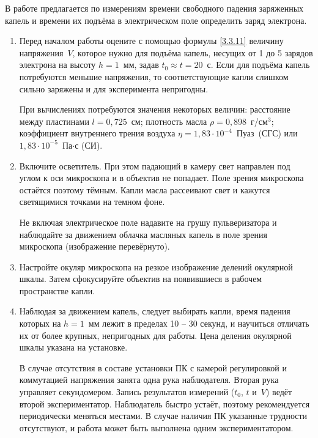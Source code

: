 \begin{lab:task}

В работе предлагается по измерениям времени свободного падения заряженных капель
и времени их подъёма в электрическом поле определить заряд электрона.

\begin{enumerate}

\item{Перед началом работы оцените с помощью формулы \eqref{3.3.11} величину
напряжения~$V$, которое нужно для подъёма капель, несущих от 1 до 5 зарядов
электрона на высоту $h=1$~мм, задав $t_0\approx t=20$~с. Если для подъёма капель
потребуются меньшие напряжения, то соответствующие капли слишком сильно заряжены
и для эксперимента непригодны.

При вычислениях потребуются значения некоторых величин: расстояние между
пластинами $l=0,725$~см; плотность масла
$\rho=0,898$~г/см$^3$; коэффициент внутреннего трения воздуха $\eta=1,83\cdot
10^{-4}$~Пуаз~(СГС) или $1,83\cdot 10^{-5}$~Па$\cdot$с (СИ).}

\item{Включите осветитель. При этом падающий в камеру свет направлен под углом к
оси микроскопа и в объектив не попадает. Поле зрения микроскопа остаётся поэтому
тёмным. Капли масла рассеивают свет и кажутся светящимися точками на темном
фоне.

Не включая электрическое поле  надавите на грушу
пульверизатора  и наблюдайте за движением облачка масляных капель в поле зрения
микроскопа (изображение перевёрнуто).}

\item{Настройте окуляр микроскопа на резкое изображение делений окулярной шкалы.
Затем сфокусируйте объектив на появившиеся в рабочем пространстве капли.}

\item{Наблюдая за движением капель, следует выбирать капли, время падения
которых на $h=1$~мм лежит в пределах
10 -- 30 секунд, и научиться отличать их от более крупных, непригодных для
работы. Цена деления окулярной шкалы указана на установке.

В случае отсутствия в составе установки ПК с камерой регулировкой и коммутацией
напряжения занята одна рука наблюдателя. Вторая рука управляет секундомером.
Запись результатов измерений ($t_0$, $t$ и~$V$) ведёт второй экспериментатор.
Наблюдатель быстро устаёт, поэтому рекомендуется периодически меняться местами.
В случае наличия ПК указанные трудности отсутствуют, и работа может быть
выполнена одним экспериментатором.

}
\end{enumerate}
\end{lab:task}
